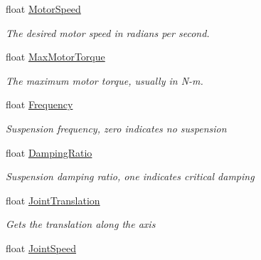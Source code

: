 \begin{DoxyCompactItemize}
float \hyperlink{class_farseer_physics_1_1_dynamics_1_1_joints_1_1_wheel_joint_a3253e1f5688e836cbac4aad027311122}{Motor\+Speed}
\begin{DoxyCompactList}\small\item\em The desired motor speed in radians per second. \end{DoxyCompactList}\item 
float \hyperlink{class_farseer_physics_1_1_dynamics_1_1_joints_1_1_wheel_joint_a1cba869feb454f7d9a649bab8a7f510c}{Max\+Motor\+Torque}
\begin{DoxyCompactList}\small\item\em The maximum motor torque, usually in N-\/m. \end{DoxyCompactList}\item 
float \hyperlink{class_farseer_physics_1_1_dynamics_1_1_joints_1_1_wheel_joint_a6ff4d519932477893f22e14f93a8a3e7}{Frequency}
\begin{DoxyCompactList}\small\item\em Suspension frequency, zero indicates no suspension \end{DoxyCompactList}\item 
float \hyperlink{class_farseer_physics_1_1_dynamics_1_1_joints_1_1_wheel_joint_a3a0f9dbb34ee64d4ea7b91d5d2c10b5c}{Damping\+Ratio}
\begin{DoxyCompactList}\small\item\em Suspension damping ratio, one indicates critical damping \end{DoxyCompactList}\item 
float \hyperlink{class_farseer_physics_1_1_dynamics_1_1_joints_1_1_wheel_joint_aad96b5522262fc1d692987f4aa2ef748}{Joint\+Translation}
\begin{DoxyCompactList}\small\item\em Gets the translation along the axis \end{DoxyCompactList}\item 
float \hyperlink{class_farseer_physics_1_1_dynamics_1_1_joints_1_1_wheel_joint_aba2ae171523a4e7bc3995091255dcc10}{Joint\+Speed}

\end{DoxyCompactItemize}
